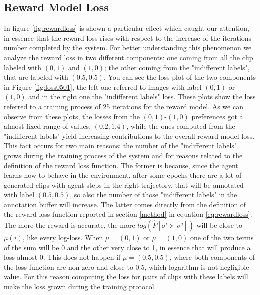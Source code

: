 \subsection{Reward Model Loss}
In figure \ref{fig:rewardloss} is shown a particular effect which caught our attention, in essence that the reward loss rises with respect to the increase of the iterations number completed by the system. 
For better understanding this phenomenon we analyze the reward loss in two different components: one coming from all the clip labeled with $(0,1)$ and $(1,0)$; the other coming from the "indifferent labels", that are labeled with $(0.5,0.5)$. You can see the loss plot of the two components in Figure \ref{fig:loss0501}, the left one referred to images with label $(0,1)$ or $(1,0)$ and in the right one the "indifferent labels" loss.
These plots show the loss referred to a training process of 25 iterations for the reward model. 
As we can observe from these plots, the losses from the $(0,1)$-$(1,0)$ preferences got a almost fixed range of values, $(0.2,1.4)$, while the ones computed from the "indifferent labels" yield increasing contributions to the overall reward model loss. 
This fact occurs for two main reasons: the number of the "indifferent labels" grows during the training process of the system and for reasons related to the definition of the reward loss function. 
The former is because, since the agent learns how to behave in the environment, after some epochs there are a lot of generated clips with agent steps in the right trajectory, that will be annotated with label $(0.5,0.5)$, so also the number of those "indifferent labels" in the annotation buffer will increase.
The latter comes directly from the definition of the reward loss function reported in section \ref{method} in equation \ref{eq:rewardloss}. The more the reward is accurate, the more $log(\hat{P}[\sigma^i \succ \sigma^j])$ will be close to $\mu(i)$, like every log-loss. When $\mu=(0,1)$ or $\mu=(1,0)$ one of the two terms of the sum will be 0 and the other very close to 1, in essence that will produce a loss almost 0. This does not happen if $\mu=(0.5,0.5)$, where both components of the loss function are non-zero and close to 0.5, which logarithm is not negligible value. For this reason computing the loss for pairs of clips with these labels will make the loss grown during the training protocol. 



